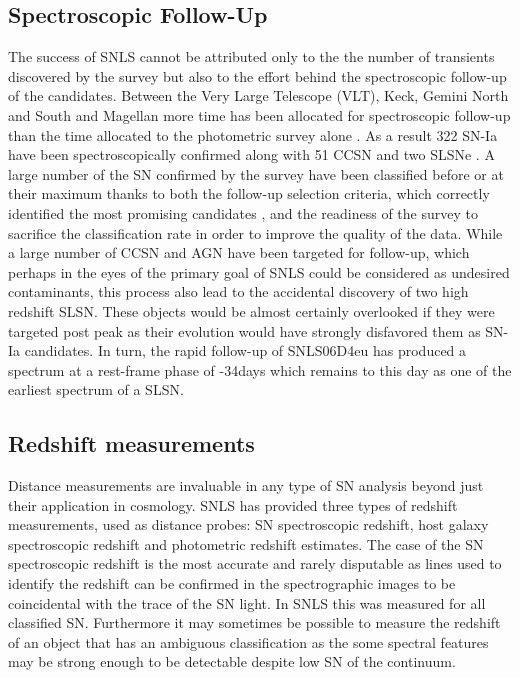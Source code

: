\subsection{Spectroscopic Follow-Up}
The success of SNLS cannot be attributed only to the the number of transients discovered by the survey but also to the effort behind the spectroscopic follow-up of the candidates. Between the Very Large Telescope (VLT), Keck, Gemini North and South and Magellan more time has been allocated for spectroscopic follow-up than the time allocated to the photometric survey alone \citep{Pritchet2004}. As a result 322 SN-Ia have been spectroscopically confirmed along with 51 CCSN and two SLSNe \citep{Guy2010,Howell2005,Howell2013}. A large number of the SN confirmed by the survey have been classified before or at their maximum thanks to both the follow-up selection criteria, which correctly identified the most promising candidates \citep{Sullivan2006}, and the readiness of the survey to sacrifice the classification rate in order to improve the quality of the data. While a large number of CCSN and AGN have been targeted for follow-up, which perhaps in the eyes of the primary goal of SNLS could be considered as undesired contaminants, this process also lead to the accidental discovery of two high redshift SLSN. These objects would be almost certainly overlooked if they were targeted post peak as their evolution would have strongly disfavored them as SN-Ia candidates. In turn, the rapid follow-up of SNLS06D4eu has produced a spectrum at a rest-frame phase of -34days which remains to this day as one of the earliest spectrum of a SLSN.

\subsection{Redshift measurements}
Distance measurements are invaluable in any type of SN analysis beyond just their application in cosmology. SNLS has provided three types of redshift measurements, used as distance probes: SN spectroscopic redshift, host galaxy spectroscopic redshift and photometric redshift estimates. The case of the SN spectroscopic redshift is the most accurate and rarely disputable as lines used to identify the redshift can be confirmed in the spectrographic images to be coincidental with the trace of the SN light. In SNLS this was measured for all classified SN. Furthermore it may sometimes be possible to measure the redshift of an object that has an ambiguous classification as the some spectral features may be strong enough to be detectable despite low S\/N of the continuum.

